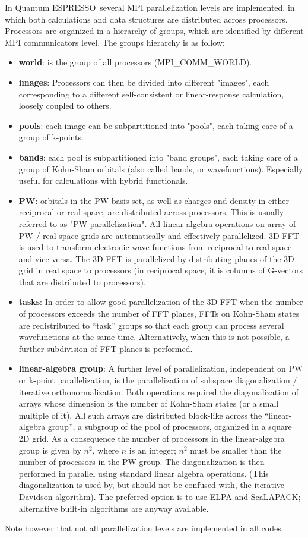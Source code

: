 \documentclass[12pt,a4paper]{article}
\def\qe{{\sc Quantum ESPRESSO}}
\begin{document}
In \qe\ several MPI parallelization levels are
implemented, in which both calculations
and data structures are distributed across processors.
Processors are organized in a hierarchy of groups,
which are identified by different MPI communicators level.
The groups hierarchy is as follow:
\begin{itemize}
\item {\bf world}: is the group of all processors (MPI\_COMM\_WORLD).
\item
{\bf images}: Processors can then be divided into different "images", 
each corresponding to a different self-consistent or linear-response
calculation, loosely coupled to others. 
\item
{\bf pools}: each image can be subpartitioned into
"pools", each taking care of a group of k-points.
\item
{\bf bands}: each pool is subpartitioned into
"band groups", each taking care of a group
of Kohn-Sham orbitals (also called bands, or
wavefunctions). Especially useful for calculations
with hybrid functionals.
\item
{\bf PW}: orbitals in the PW basis set,
as well as charges and density in either
reciprocal or real space, are distributed
across processors.
This is usually referred to as "PW parallelization".
All linear-algebra operations on array of  PW /
real-space grids are automatically and effectively parallelized.
3D FFT is used to transform electronic wave functions from
reciprocal to real space and vice versa. The 3D FFT is
parallelized by distributing planes of the 3D grid in real
space to processors (in reciprocal space, it is columns of
G-vectors that are distributed to processors).
\item
{\bf tasks}:
In order to allow good parallelization of the 3D FFT when
the number of processors exceeds the number of FFT planes,
FFTs on Kohn-Sham states are redistributed to
``task'' groups so that each group
can process several wavefunctions at the same time.
Alternatively, when this is not possible, a further
subdivision of FFT planes is performed.
\item
{\bf linear-algebra group}:
A further level of parallelization, independent on
PW or k-point parallelization, is the parallelization of
subspace diagonalization / iterative orthonormalization.
 Both operations required the diagonalization of
arrays whose dimension is the number of Kohn-Sham states
(or a small multiple of it). All such arrays are distributed block-like
across the ``linear-algebra group'', a subgroup of the pool of processors,
organized in a square 2D grid. As a consequence the number of processors
in the linear-algebra group is given by $n^2$, where $n$ is an integer;
$n^2$ must be smaller than the number of processors in the PW group.
The diagonalization is then performed
in parallel using standard linear algebra operations.
(This diagonalization is used by, but should not be confused with,
the iterative Davidson algorithm). The preferred option is to use
ELPA and ScaLAPACK; alternative built-in algorithms are anyway available.
\end{itemize}
Note however that not all parallelization levels
are implemented in all codes.
\end{document}
